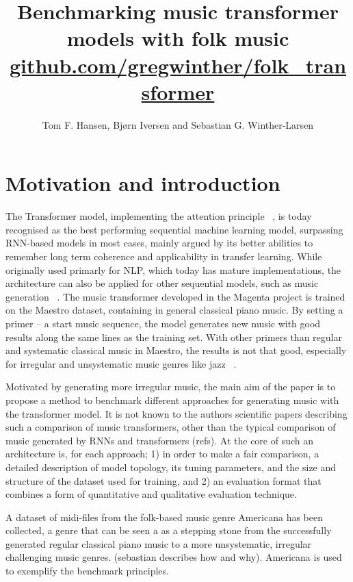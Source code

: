 \documentclass{article}
\title{Benchmarking music transformer models with folk music \\
    \normalsize{\url{github.com/gregwinther/folk_transformer}}}
\author{Tom F. Hansen, Bjørn Iversen and Sebastian G. Winther-Larsen}
\begin{document}
    \maketitle

    \section{Motivation and introduction}

        The Transformer model, implementing the attention principle ~\cite{vaswani2017attention},
        is today recognised as the best performing sequential machine learning model,
        surpassing RNN-based models in most cases, mainly argued by its better abilities
        to remember long term coherence and applicability in transfer learning.
        While originally used primarly for NLP, which today has mature implementations,
        the architecture can also be applied for other sequential models,
        such as music generation ~\cite{huang2018music}.
        The music transformer developed in the Magenta project is trained on the Maestro dataset,
        containing in general classical piano music.
        By setting a primer – a start music sequence, the model generates new music with good
        results along the same lines as the training set. With other primers than regular and
        systematic classical music in Maestro, the results is not that good, especially for
        irregular and unsystematic music genres like jazz ~\cite{wu2020jazz}.
        
        Motivated by generating more irregular music, the main aim of the paper is
        to propose a method to benchmark different approaches for generating music
        with the transformer model. It is not known to the authors scientific papers
        describing such a comparison of music transformers, other than the typical
        comparison of music generated by RNNs and transformers (refs). At the core
        of such an architecture is, for each approach; 1) in order to make a fair comparison,
        a detailed description of model topology, its tuning parameters, and the size
        and structure of the dataset used for training, and 2) an evaluation format
        that combines a form of quantitative and qualitative evaluation technique.
        
        A dataset of midi-files from the folk-based music genre Americana has been
        collected, a genre that can be seen a as a stepping stone from the successfully
        generated regular classical piano music to a more unsystematic, irregular
        challenging music genres. (sebastian describes how and why).
        Americana is used to exemplify the benchmark principles.
\end{document}
